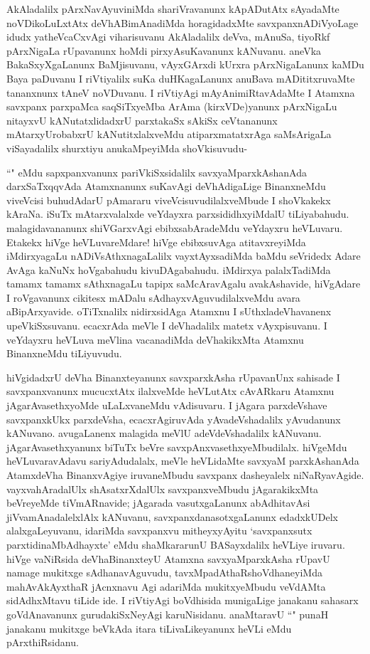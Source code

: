 \begin{artha}
AkAladalilx pArxNavAyuviniMda shariVravanunx kApADutAtx sAyadaMte noVDikoLuLxtAtx deVhABimAnadiMda horagidadxMte savxpanxnADiVyoLage idudx yatheVcaCxvAgi viharisuvanu AkAladalilx deVva, mAnuSa, tiyoRkf pArxNigaLa rUpavanunx hoMdi pirxyAsuKavanunx kANuvanu. aneVka BakaSxyXgaLanunx BaMjisuvanu, vAyxGArxdi kUrxra pArxNigaLanunx kaMDu Baya paDuvanu I riVtiyalilx suKa duHKagaLanunx anuBava mADititxruvaMte tananxnunx tAneV noVDuvanu. I riVtiyAgi mAyAnimiRtavAdaMte I Atamxna savxpanx parxpaMca saqSiTxyeMba ArAma (kirxVDe)yanunx pArxNigaLu nitayxvU kANutatxlidadxrU parxtakaSx sAkiSx ceVtananunx mAtarxyUrobabxrU kANutitxlalxveMdu atiparxmatatxrAga saMsArigaLa viSayadalilx shurxtiyu anukaMpeyiMda shoVkisuvudu-
\end{artha}

\begin{artha}%
``\stext " eMdu sapxpanxvanunx pariVkiSxsidalilx savxyaMparxkAshanAda darxSaTxqqvAda Atamxnanunx suKavAgi deVhAdigaLige BinanxneMdu viveVcisi buhudAdarU pAmararu viveVcisuvudilalxveMbude I shoVkakekx kAraNa. iSuTx mAtarxvalalxde veYdayxra parxsididhxyiMdalU tiLiyabahudu. malagidavananunx shiVGarxvAgi ebibxsabAradeMdu veYdayxru heVLuvaru. Etakekx hiVge heVLuvareMdare! hiVge ebibxsuvAga atitavxreyiMda iMdirxyagaLu nADiVsAthxnagaLalilx vayxtAyxsadiMda baMdu seVridedx Adare AvAga kaNuNx hoVgabahudu kivuDAgabahudu. iMdirxya palalxTadiMda tamamx tamamx sAthxnagaLu tapipx saMcAravAgalu avakAshavide, hiVgAdare I roVgavanunx cikitesx mADalu sAdhayxvAguvudilalxveMdu avara aBipArxyavide. oTiTxnalilx nidirxsidAga Atamxnu I sUthxladeVhavanenx upeVkiSxsuvanu. ecacxrAda meVle I deVhadalilx matetx vAyxpisuvanu. I veYdayxru heVLuva meVlina vacanadiMda deVhakikxMta Atamxnu BinanxneMdu tiLiyuvudu.  
\end{artha}

\begin{artha}
hiVgidadxrU deVha Binanxteyanunx savxparxkAsha rUpavanUnx sahisade I savxpanxvanunx mucucxtAtx ilalxveMde heVLutAtx cAvARkaru Atamxnu jAgarAvasethxyoMde uLaLxvaneMdu vAdisuvaru. I jAgara parxdeVshave savxpanxkUkx parxdeVsha, ecacxrAgiruvAda yAvadeVshadalilx yAvudanunx kANuvano. avugaLanenx malagida meVlU adeVdeVshadalilx kANuvanu. jAgarAvasethxyanunx biTuTx beVre savxpAnxvasethxyeMbudilalx. hiVgeMdu heVLuvaravAdavu sariyAdudalalx, meVle heVLidaMte savxyaM parxkAshanAda AtamxdeVha BinanxvAgiye iruvaneMbudu savxpanx dasheyalelx niNaRyavAgide. vayxvahAradalUlx shAsatxrXdalUlx savxpanxveMbudu jAgarakikxMta beVreyeMde tiVmARnavide; jAgarada vasutxgaLanunx abAdhitavAsi jiVvamAnadalelxlAlx kANuvanu, savxpanxdanasotxgaLanunx edadxkUDelx alalxgaLeyuvanu, idariMda savxpanxvu mitheyxyAyitu `savxpanxsutx parxtidinaMbAdhayxte' eMdu shaMkararunU BASayxdalilx heVLiye iruvaru. hiVge vaNiRsida deVhaBinanxteyU Atamxna savxyaMparxkAsha rUpavU namage mukitxge sAdhanavAguvudu, tavxMpadAthaRshoVdhaneyiMda mahAvAkAyxthaR jAcnxnavu Agi adariMda mukitxyeMbudu veVdAMta sidAdhxMtavu tiLide ide. I riVtiyAgi boVdhisida munigaLige janakanu sahasarx goVdAnavanunx gurudakiSxNeyAgi karuNisidanu. anaMtaravU ``\stext " punaH janakanu mukitxge beVkAda itara tiLivaLikeyanunx heVLi eMdu pArxthiRsidanu. 
\end{artha}%

